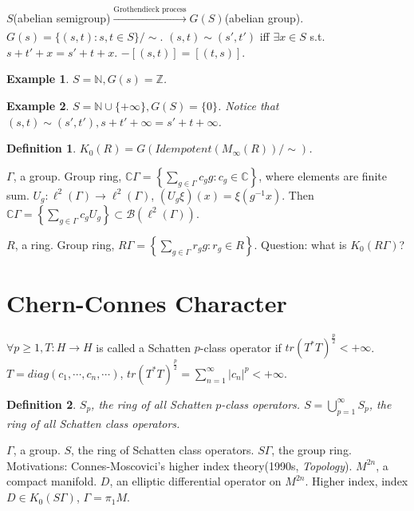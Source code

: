 \documentclass[12pt]{article}
\newtheorem{definition}{Definition}
\newtheorem{example}{Example}
\begin{document}
$S$(abelian semigroup)$\xrightarrow[]{\text{Grothendieck process}}$$G(S)$(abelian group). $G(s)=\{(s,t):s,t\in S \}/\sim$. $(s,t)\sim(s',t') $ iff $\exists x\in S $ s.t. $s+t'+x=s'+t+x$. $-[(s,t)]=[(t,s)]$.
\begin{example}
$S=\mathbb N,G(s)=\mathbb Z$.
\end{example}
\begin{example}
$S=\mathbb N\cup\{+\infty\},G(S)=\{0\}$. Notice that $(s,t)\sim(s',t'),s+t'+\infty=s'+t+\infty $.
\end{example}
\begin{definition}
$K_0(R)=G(Idempotent(M_\infty(R))/\sim)$.
\end{definition}
$\Gamma$, a group. Group ring, $\mathbb C\Gamma=\left\{\sum_{g\in\Gamma}c_gg:c_g\in\mathbb C \right\}$, where elements are finite sum. $U_g:\ell^2(\Gamma)\to \ell^2(\Gamma)$, $(U_g\xi)(x)=\xi(g^{-1}x)$. Then $\mathbb C\Gamma=\left\{\sum_{g\in\Gamma}c_gU_g \right\}\subset \mathcal B(\ell^2(\Gamma))$.

$R$, a ring. Group ring, $R\Gamma=\left\{\sum_{g\in\Gamma}r_gg:r_g\in R \right\}$. Question: what is $K_0(R\Gamma)$?

\section{Chern-Connes Character}
$\forall p\ge 1, T:H\to H$ is called a Schatten $p$-class operator if $tr(T^*T)^{\frac{p}{2}}<+\infty$. $T=diag(c_1,\cdots,c_n,\cdots)$, $tr(T^*T)^{\frac{p}{2}}=\sum_{n=1}^\infty|c_n|^p<+\infty$.
\begin{definition}
$S_p$, the ring of all Schatten $p$-class operators. $S=\bigcup_{p=1}^\infty S_p$, the ring of all Schatten class operators.
\end{definition}
$\Gamma$, a group. $S$, the ring of Schatten class operators. $S\Gamma$, the group ring. Motivations: Connes-Moscovici's higher index theory(1990s, \textit{Topology}). $M^{2n}$, a compact manifold. $D$, an elliptic differential operator on $M^{2n}$. Higher index, index $D\in K_0(S\Gamma)$, $\Gamma=\pi_1M$.
\end{document}
